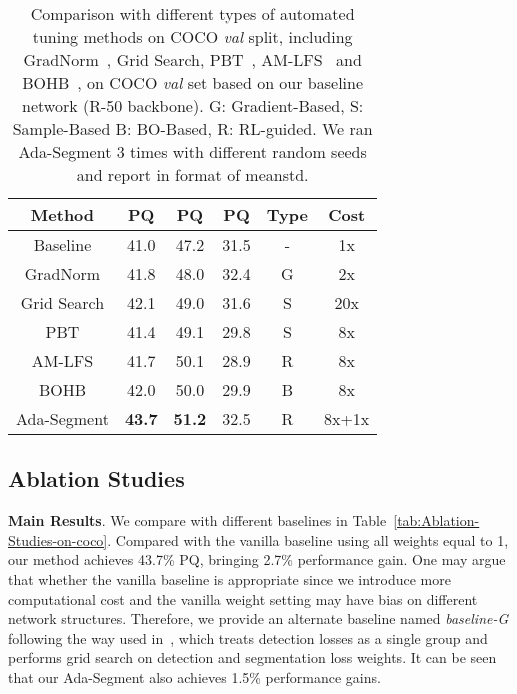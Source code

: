 \documentclass[letterpaper]{article} \usepackage{aaai21}  \usepackage{times}  \usepackage{helvet} \usepackage{courier}  \usepackage[hyphens]{url}  \usepackage{graphicx} \urlstyle{rm} \def\UrlFont{\rm}  \usepackage{natbib}  \usepackage{caption} \frenchspacing  \setlength{\pdfpagewidth}{8.5in}  \setlength{\pdfpageheight}{11in}
\begin{document}
\begin{table}[t]
  \begin{centering}
  \tabcolsep 0.02in\renewcommand{\arraystretch}{1.1}{\footnotesize{}}\begin{tabular}{c|ccc|c|c}
  \hline 
  Method & PQ & PQ & PQ & Type & Cost \tabularnewline
  \hline 
  \hline
  Baseline & 41.0 & 47.2 & 31.5 & - & 1x\tabularnewline
  \hline
  GradNorm & 41.8 & 48.0 & 32.4 & G & 2x\tabularnewline
  Grid Search & 42.1 & 49.0 & 31.6 & S & 20x\tabularnewline
  PBT & 41.4 & 49.1 & 29.8 & S & 8x\tabularnewline
  AM-LFS & 41.7 & 50.1 & 28.9 & R & 8x\tabularnewline
  BOHB & 42.0 & 50.0 & 29.9 & B & 8x\tabularnewline
  \hline
  Ada-Segment & \textbf{43.7} & \textbf{51.2} & 
  32.5 & R & 8x+1x\tabularnewline
  \hline 
  \end{tabular}{\footnotesize\par}
  \par\end{centering}


  \caption{\label{tab:Searching-method}
  Comparison with different types of automated tuning methods on COCO \textit{val} split,
  including GradNorm~\cite{chen2017gradnorm}, Grid Search, PBT~\cite{jaderberg2017pbt}, 
  AM-LFS~\cite{li2019AMlfs} and BOHB~\cite{falkner2018bohb},
  on COCO \textit{val} set based
  on our baseline network (R-50 backbone). 
  G: Gradient-Based, S: Sample-Based B: BO-Based, R: RL-guided. 
  We ran Ada-Segment 3 times with different random seeds
  and report in format of meanstd.}
\end{table}


 \subsection{Ablation Studies}




\noindent
 \textbf{Main Results}.
 We compare with different baselines in Table~\ref{tab:Ablation-Studies-on-coco}. 
 Compared with the vanilla baseline using
 all weights equal to 1, our method achieves 43.7\% PQ, bringing 2.7\% performance gain. 
 One may argue that whether the vanilla baseline is appropriate since we introduce 
 more computational cost and the vanilla weight setting may have bias on different network structures. 
 Therefore, we provide an alternate baseline named \textit{baseline-G} 
 following the way used in~\cite{panopticFPNkirillov2019}, which treats detection losses
 as a single group and performs grid search on detection and segmentation loss weights. 
 It can be seen that our Ada-Segment also achieves 1.5\% performance gains.
\end{document}
